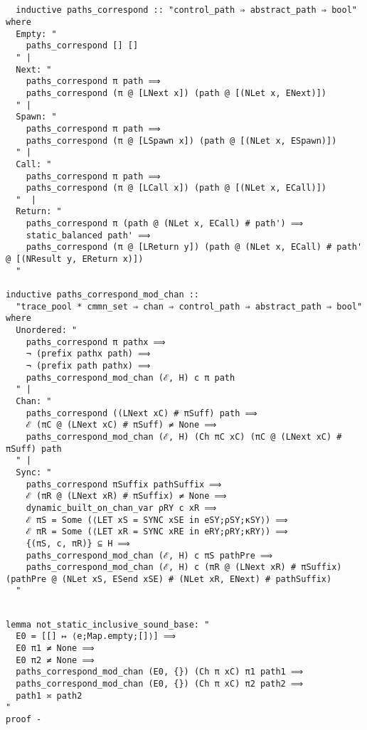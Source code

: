 \documentclass{article}
\begin{document}
\begin{lstlisting}[style=codestyle1, escapechar=\%]


  inductive paths_correspond :: "control_path ⇒ abstract_path ⇒ bool" where
  Empty: "
    paths_correspond [] []
  " |
  Next: "
    paths_correspond π path ⟹
    paths_correspond (π @ [LNext x]) (path @ [(NLet x, ENext)])
  " |
  Spawn: "
    paths_correspond π path ⟹
    paths_correspond (π @ [LSpawn x]) (path @ [(NLet x, ESpawn)])
  " |
  Call: "
    paths_correspond π path ⟹
    paths_correspond (π @ [LCall x]) (path @ [(NLet x, ECall)])
  "  |
  Return: "
    paths_correspond π (path @ (NLet x, ECall) # path') ⟹
    static_balanced path' ⟹
    paths_correspond (π @ [LReturn y]) (path @ (NLet x, ECall) # path' @ [(NResult y, EReturn x)])
  " 

inductive paths_correspond_mod_chan :: 
  "trace_pool * cmmn_set ⇒ chan ⇒ control_path ⇒ abstract_path ⇒ bool" where
  Unordered: "
    paths_correspond π pathx ⟹
    ¬ (prefix pathx path) ⟹
    ¬ (prefix path pathx) ⟹
    paths_correspond_mod_chan (ℰ, H) c π path
  " |
  Chan: "
    paths_correspond ((LNext xC) # πSuff) path ⟹
    ℰ (πC @ (LNext xC) # πSuff) ≠ None ⟹
    paths_correspond_mod_chan (ℰ, H) (Ch πC xC) (πC @ (LNext xC) # πSuff) path
  " |
  Sync: "
    paths_correspond πSuffix pathSuffix ⟹
    ℰ (πR @ (LNext xR) # πSuffix) ≠ None ⟹
    dynamic_built_on_chan_var ρRY c xR ⟹
    ℰ πS = Some (⟨LET xS = SYNC xSE in eSY;ρSY;κSY⟩) ⟹
    ℰ πR = Some (⟨LET xR = SYNC xRE in eRY;ρRY;κRY⟩) ⟹
    {(πS, c, πR)} ⊆ H ⟹
    paths_correspond_mod_chan (ℰ, H) c πS pathPre ⟹
    paths_correspond_mod_chan (ℰ, H) c (πR @ (LNext xR) # πSuffix) (pathPre @ (NLet xS, ESend xSE) # (NLet xR, ENext) # pathSuffix)
  " 

  \end{lstlisting}




\begin{lstlisting}[style=codestyle1, escapechar=\%]

lemma not_static_inclusive_sound_base: "
  E0 = [[] ↦ ⟨e;Map.empty;[]⟩] ⟹
  E0 π1 ≠ None ⟹
  E0 π2 ≠ None ⟹
  paths_correspond_mod_chan (E0, {}) (Ch π xC) π1 path1 ⟹ 
  paths_correspond_mod_chan (E0, {}) (Ch π xC) π2 path2 ⟹
  path1 ≍ path2
"
proof -
  \end{lstlisting}
\end{document}
